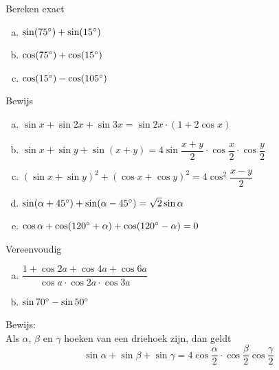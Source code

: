 \documentclass[a4paper,12pt]{article}
\begin{document}
\begin{oefening}
Bereken exact
\begin{enumerate}[(a)]
\itemsep.5em
  \item $\sin(75^\circ)+\sin(15^\circ)$
  \item $\cos(75^\circ)+\cos(15^\circ)$
  \item $\cos(15^\circ)-\cos(105^\circ)$
\end{enumerate}
\end{oefening}

\begin{oefening}
Bewijs
\begin{enumerate}[(a)]
\itemsep.5em
  \item $\sin x + \sin 2x + \sin 3x = \sin 2x \cdot (1 + 2\cos x)$
  \item $\sin x + \sin y + \sin(x+y) = 4\sin\dfrac{x+y}{2}\cdot\cos\dfrac{x}{2}\cdot\cos\dfrac{y}{2}$
  \item $\left(\sin x + \sin y\right)^2 + \left(\cos x + \cos y\right)^2 = 4\cos^2\dfrac{x-y}{2}$
  \item $\sin(\alpha + 45^\circ) + \sin(\alpha - 45^\circ) = \sqrt{2}\sin\alpha$
  \item $\cos \alpha + \cos(120^\circ + \alpha) + \cos(120^\circ - \alpha) = 0$
\end{enumerate}
\end{oefening}

\begin{oefening}
Vereenvoudig\\
\begin{enumerate}[(a)]
\itemsep.8em
  \item $\dfrac{1+\cos 2a + \cos 4a + \cos 6a}{\cos a \cdot \cos 2a \cdot \cos 3a}$
  \item $\sin 70^\circ - \sin 50^\circ$
\end{enumerate}
\end{oefening}
 
 \begin{oefening}Bewijs:\\
 Als $\alpha$, $\beta$ en $\gamma$ hoeken van een driehoek zijn, dan geldt
 $$\sin\alpha + \sin\beta + \sin\gamma = 4 \cos\dfrac{\alpha}{2}\cdot\cos\dfrac{\beta}{2}\cos\dfrac{\gamma}{2}$$
 \end{oefening}
 

\end{document}
